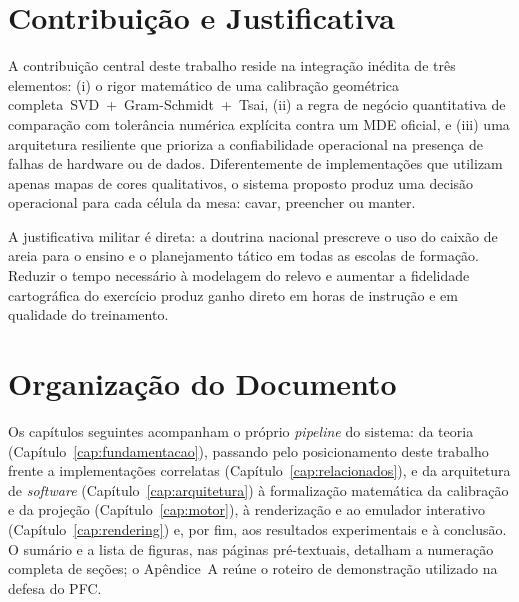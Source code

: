 \section{Contribuição e Justificativa}
\label{sec:contribuicao}

A contribuição central deste trabalho reside na integração inédita de
três elementos: (i) o rigor matemático de uma calibração
geométrica completa~\mbox{SVD + Gram-Schmidt + Tsai}, (ii) a regra
de negócio quantitativa de comparação com tolerância numérica explícita
contra um MDE oficial, e (iii) uma arquitetura resiliente que
prioriza a confiabilidade operacional na presença de falhas de hardware
ou de dados. Diferentemente de implementações que utilizam apenas mapas
de cores qualitativos, o sistema proposto produz uma decisão
operacional para cada célula da mesa: cavar, preencher ou manter.

A justificativa militar é direta: a doutrina nacional prescreve o uso
do caixão de areia para o ensino e o planejamento tático em todas as
escolas de formação. Reduzir o tempo necessário à modelagem do relevo
e aumentar a fidelidade cartográfica do exercício produz ganho direto
em horas de instrução e em qualidade do treinamento.

\section{Organização do Documento}
\label{sec:organizacao}

Os capítulos seguintes acompanham o próprio \textit{pipeline} do
sistema: da teoria (Capítulo~\ref{cap:fundamentacao}), passando pelo
posicionamento deste trabalho frente a implementações correlatas
(Capítulo~\ref{cap:relacionados}), e da arquitetura
de \textit{software} (Capítulo~\ref{cap:arquitetura}) à formalização
matemática da calibração e da projeção (Capítulo~\ref{cap:motor}), à
renderização e ao emulador interativo (Capítulo~\ref{cap:rendering}) e,
por fim, aos resultados experimentais e à conclusão. O sumário e a
lista de figuras, nas páginas pré-textuais, detalham a numeração
completa de seções; o Apêndice~A reúne o roteiro de demonstração
utilizado na defesa do PFC.
